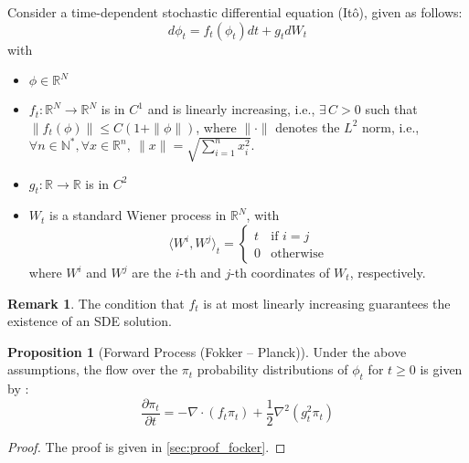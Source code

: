 \documentclass[a4paper,10pt]{article}
\theoremstyle{definition} %
\theoremstyle{definition} %
\newtheorem{proposition}[definition]{Proposition}
\theoremstyle{definition} %
\theoremstyle{definition} %
\newtheorem{remark}[definition]{Remark}
\begin{document}
Consider a time-dependent stochastic differential equation (Itô), given as follows:
    \begin{equation}\label{eq:SDE}
         d\phi_t = f_t(\phi_t)dt + g_tdW_t
    \end{equation}
    with 
    \begin{itemize}
        \item $\phi \in \mathbb{R}^N$
        
        \item $f_t : \mathbb{R}^N \rightarrow \mathbb{R}^N$ is in $C^1$ and is linearly increasing, i.e., $\exists\, C > 0$ such that $\|f_t(\phi)\| \leq C(1 + \|\phi\|)$, where $\|\cdot\|$ denotes the $L^2$ norm, i.e., $\forall n \in \mathbb{N}^*, \forall x \in \mathbb{R}^n,\ \|x\| = \sqrt{\sum\limits_{i=1}^n x_i^2}$.
        
        \item $g_t : \mathbb{R} \rightarrow \mathbb{R}$ is in $C^2$
        
        \item $W_t$ is a standard Wiener process in $\mathbb{R}^N$, with
        \begin{equation*}
            \langle W^i, W^j \rangle_t =
            \begin{cases}
                t & \text{if } i = j \\
                0 & \text{otherwise}
            \end{cases}
        \end{equation*}
        where $W^i$ and $W^j$ are the $i$-th and $j$-th coordinates of $W_t$, respectively.
    \end{itemize}
    
    \begin{remark}
        The condition that $f_t$ is at most linearly increasing guarantees the existence of an SDE solution.
    \end{remark}

\begin{proposition}[Forward Process (Fokker – Planck)\label{prop:fokker}] 
    Under the above assumptions, the flow over the $\pi_t$ probability distributions of $\phi_t$ for $t \geq 0$ is given by :    \begin{equation}\label{eq:Fokker-Planck}
        \frac{\partial\pi_t}{\partial t} = -\nabla \cdot (f_t \pi_t) + \frac{1}{2}\nabla^2(g_t^2\pi_t)
    \end{equation}
\end{proposition}
\begin{proof}
    The proof is given in \cref{sec:proof_focker}.
\end{proof}
\end{document}
